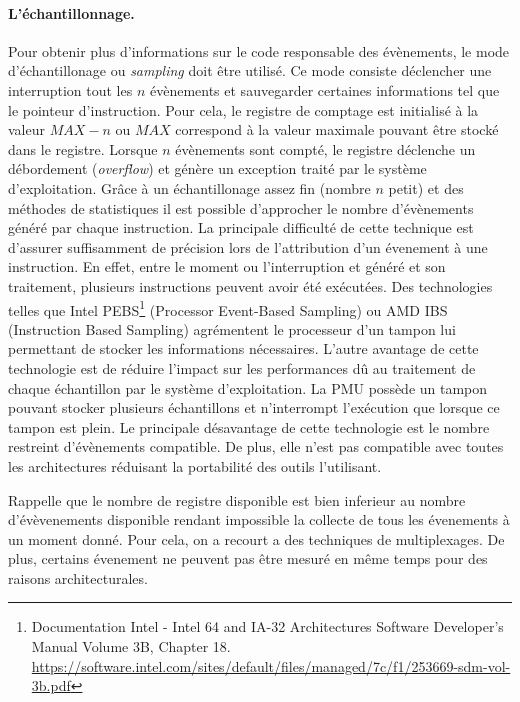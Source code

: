         \paragraph{L'échantillonnage.} Pour obtenir plus d'informations sur le code responsable des évènements, le mode d'échantillonage ou \textit{sampling} doit être utilisé. Ce mode consiste déclencher une interruption tout les $n$ évènements et sauvegarder certaines informations tel que le pointeur d'instruction. Pour cela, le registre de comptage est initialisé à la valeur $MAX - n$ ou $MAX$ correspond à la valeur maximale pouvant être stocké dans le registre. Lorsque $n$ évènements sont compté, le registre déclenche un débordement (\textit{overflow}) et génère un exception traité par le système d'exploitation. Grâce à un échantillonage assez fin (nombre $n$ petit) et des méthodes de statistiques il est possible d'approcher le nombre d'évènements généré par chaque instruction. La principale difficulté de cette technique est d'assurer suffisamment de précision lors de l'attribution d'un évenement à une instruction. En effet, entre le moment ou l'interruption et généré et son traitement, plusieurs instructions peuvent avoir été exécutées. Des technologies telles que Intel PEBS\footnote{Documentation Intel - Intel 64 and IA-32 Architectures Software Developer’s Manual Volume 3B, Chapter 18. \url{https://software.intel.com/sites/default/files/managed/7c/f1/253669-sdm-vol-3b.pdf}} (Processor Event-Based Sampling) ou AMD IBS (Instruction Based Sampling) \cite{Drongowski2007} agrémentent le processeur d'un tampon lui permettant de stocker les informations nécessaires. L'autre avantage de cette technologie est de réduire l'impact sur les performances dû au traitement de chaque échantillon par le système d'exploitation. La PMU possède un tampon pouvant stocker plusieurs échantillons et n'interrompt l'exécution que lorsque ce tampon est plein. Le principale désavantage de cette technologie est le nombre restreint d'évènements compatible. De plus, elle n'est pas compatible avec toutes les architectures réduisant la portabilité des outils l'utilisant.
   
   \bigbreak

   Rappelle que le nombre de registre disponible est bien inferieur au nombre d’évèvenements disponible rendant impossible la collecte de tous les évenements à un moment donné. Pour cela, on a recourt a des techniques de multiplexages. De plus, certains évenement ne peuvent pas être mesuré en même temps pour des raisons architecturales.

